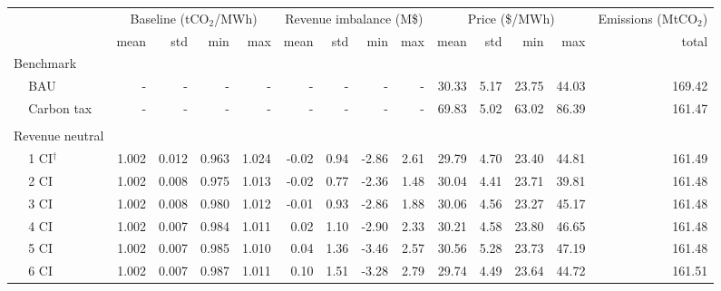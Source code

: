 \begin{tabular}{ll*{13}{r}}
\toprule
              &      & \multicolumn{4}{c}{Baseline (tCO$_{2}$/MWh)} & \multicolumn{4}{c}{Revenue imbalance (M\$)} & \multicolumn{4}{c}{Price (\$/MWh)} & Emissions (MtCO$_{2}$) \\
              &      &                     mean &    std &    min &    max &                    mean &    std &     min &    max &           mean &   std &    min &    max &                  total \\
\midrule
\multicolumn{2}{l}{Benchmark} &&&&&&&&&&&&&\\ & BAU &                        - &      - &      - &      - &                       - &      - &       - &      - &          30.33 &  5.17 &  23.75 &  44.03 &                 169.42 \\
              & Carbon tax &                        - &      - &      - &      - &                       - &      - &       - &      - &          69.83 &  5.02 &  63.02 &  86.39 &                 161.47 \\
&&&&&&&&&&&&&& \\ \multicolumn{2}{l}{Revenue neutral} &&&&&&&&&&&&&\\ & 1 CI$^{\dagger}$ &                    1.002 &  0.012 &  0.963 &  1.024 &                   -0.02 &   0.94 &   -2.86 &   2.61 &          29.79 &  4.70 &  23.40 &  44.81 &                 161.49 \\
              & 2 CI &                    1.002 &  0.008 &  0.975 &  1.013 &                   -0.02 &   0.77 &   -2.36 &   1.48 &          30.04 &  4.41 &  23.71 &  39.81 &                 161.48 \\
              & 3 CI &                    1.002 &  0.008 &  0.980 &  1.012 &                   -0.01 &   0.93 &   -2.86 &   1.88 &          30.06 &  4.56 &  23.27 &  45.17 &                 161.48 \\
              & 4 CI &                    1.002 &  0.007 &  0.984 &  1.011 &                    0.02 &   1.10 &   -2.90 &   2.33 &          30.21 &  4.58 &  23.80 &  46.65 &                 161.48 \\
              & 5 CI &                    1.002 &  0.007 &  0.985 &  1.010 &                    0.04 &   1.36 &   -3.46 &   2.57 &          30.56 &  5.28 &  23.73 &  47.19 &                 161.48 \\
              & 6 CI &                    1.002 &  0.007 &  0.987 &  1.011 &                    0.10 &   1.51 &   -3.28 &   2.79 &          29.74 &  4.49 &  23.64 &  44.72 &                 161.51 \\

\end{tabular}
